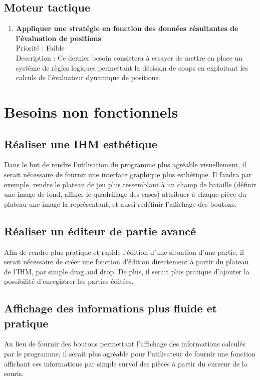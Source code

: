 		\subsection{Moteur tactique}

			\begin{enumerate}

				\item \textbf{Appliquer une stratégie en fonction des données résultantes de l'évaluation de positions} 
				\\[0.7\baselineskip]
				Priorité : Faible 
				\\[0.7\baselineskip]
				Description : Ce dernier besoin consistera à essayer de mettre en place un système de règles logiques permettant la décision de coups en exploitant les 
				calculs de l'évaluateur dynamique de positions. 
				
			\end{enumerate}
	

	\section{Besoins non fonctionnels}
        
                \subsection{Réaliser une IHM esthétique}
                
                Dans le but de rendre l'utilisation du programme plus agréable visuellement, il serait nécessaire de fournir une interface graphique plus esthétique.
                Il faudra par exemple, rendre le plateau de jeu plus ressemblant à un champ de bataille (définir une image de fond, affiner le quadrillage des cases) attribuer à chaque pièce du plateau une image la représentant, et aussi redéfinir l'affichage des boutons.

                \subsection{Réaliser un éditeur de partie avancé}

                Afin de rendre plus pratique et rapide l'édition d'une situation d'une partie, il serait nécessaire de créer une fonction d'édition directement à partir du plateau de l'IHM, par simple drag and drop.
                De plus, il serait plus pratique d'ajouter la possibilité d'enregistrer les parties éditées.

                \subsection{Affichage des informations plus fluide et pratique}

                Au lieu de fournir des boutons permettant l'affichage des informations calculés par le programme, il serait plus agréable pour l'utilisateur de fournir une fonction affichant ces informations par simple survol des pièces à partir du curseur de la souris.
